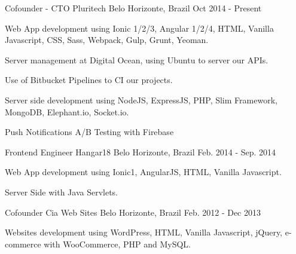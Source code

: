

\begin{cventries}

  \cventry
    {Cofounder - CTO} %
    {Pluritech} %
    {Belo Horizonte, Brazil} %
    {Oct 2014 - Present} %
    {
      \begin{cvitems} %
        \item {Web App development using Ionic 1/2/3, Angular 1/2/4, HTML, Vanilla Javascript, CSS, Sass, Webpack, Gulp, Grunt, Yeoman.}
        \item {Server management at Digital Ocean, using Ubuntu to server our APIs.}
        \item {Use of Bitbucket Pipelines to CI our projects.}
        \item {Server side development using NodeJS, ExpressJS, PHP, Slim Framework, MongoDB, Elephant.io, Socket.io.}
        \item {Push Notifications A/B Testing with Firebase}
      \end{cvitems}
    }

  \cventry
    {Frontend Engineer} %
    {Hangar18} %
    {Belo Horizonte, Brazil} %
    {Feb. 2014  - Sep. 2014} %
    {
      \begin{cvitems} %
        \item {Web App development using Ionic1, AngularJS, HTML, Vanilla Javascript.}
        \item {Server Side with Java Servlets.}
      \end{cvitems}
    }

  \cventry
    {Cofounder} %
    {Cia Web Sites} %
    {Belo Horizonte, Brazil} %
    {Feb. 2012 - Dec 2013} %
    {
      \begin{cvitems} %
        \item {Websites development using WordPress, HTML, Vanilla Javascript, jQuery, e-commerce with WooCommerce, PHP and MySQL.}
      \end{cvitems}
    }


\end{cventries}

